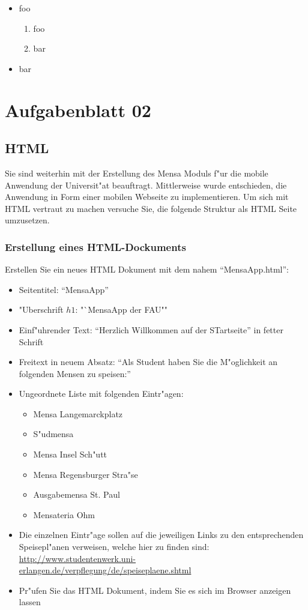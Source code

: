 

\begin{itemize}
    \item foo
    \begin{enumerate}
        \item foo
        \item bar
    \end{enumerate}
    \item bar
\end{itemize}


\chapter{Aufgabenblatt 02}

\section{HTML}
Sie sind weiterhin mit der Erstellung des Mensa Moduls f"ur die mobile Anwendung der Universit"at beauftragt.
Mittlerweise wurde entschieden, die Anwendung in Form einer mobilen Webseite zu implementieren.
Um sich mit HTML vertraut zu machen versuche Sie, die folgende Struktur als HTML Seite umzusetzen.

\subsection{Erstellung eines HTML-Dockuments}
Erstellen Sie ein neues HTML Dokument mit dem nahem "`MensaApp.html"':
\begin{itemize}
    \item Seitentitel: "`MensaApp"'
    \item "Uberschrift $h1$: "`MensaApp der FAU""
    \item Einf"uhrender Text: "`Herzlich Willkommen auf der STartseite"' in fetter Schrift
    \item Freitext in neuem Absatz: "`Als Student haben Sie die M"oglichkeit an folgenden Mensen zu speisen:"'
    \item Ungeordnete Liste mit folgenden Eintr"agen:
    \begin{itemize}
        \item Mensa Langemarckplatz
        \item S"udmensa
        \item Mensa Insel Sch"utt
        \item Mensa Regensburger Stra"se
        \item Ausgabemensa St. Paul
        \item Mensateria Ohm
    \end{itemize}
    \item Die einzelnen Eintr"age sollen auf die jeweiligen Links zu den entsprechenden Speisepl"anen verweisen, welche hier zu finden sind: \url{http://www.studentenwerk.uni-erlangen.de/verpflegung/de/speiseplaene.shtml}
    \item Pr"ufen Sie das HTML Dokument, indem Sie es sich im Browser anzeigen lassen
\end{itemize}

\lstset{style=customHTML}


